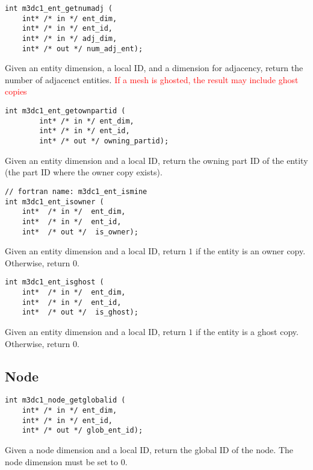 \begin{verbatim}
int m3dc1_ent_getnumadj (
    int* /* in */ ent_dim, 
    int* /* in */ ent_id, 
    int* /* in */ adj_dim,
    int* /* out */ num_adj_ent);
\end{verbatim}\vspace{-.5cm}\hspace{1cm}
Given an entity dimension, a local ID, and a dimension for adjacency, return the number of adjacenct entities. \textcolor{red}{If a mesh is ghosted, the result may include ghost copies}
	      
\begin{verbatim}
int m3dc1_ent_getownpartid (
        int* /* in */ ent_dim, 
        int* /* in */ ent_id, 
        int* /* out */ owning_partid); 
\end{verbatim}\vspace{-.5cm}\hspace{1cm}
Given an entity dimension and a local ID, return the owning part ID of the entity (the part ID where the owner copy exists). 

\begin{verbatim}
// fortran name: m3dc1_ent_ismine
int m3dc1_ent_isowner (
    int*  /* in */  ent_dim, 
    int*  /* in */  ent_id, 
    int*  /* out */  is_owner); 
\end{verbatim}\vspace{-.5cm}\hspace{1cm}
Given an entity dimension and a local ID, return $1$ if the entity is an owner copy. Otherwise, return $0$.

\begin{verbatim}
int m3dc1_ent_isghost (
    int*  /* in */  ent_dim, 
    int*  /* in */  ent_id, 
    int*  /* out */  is_ghost); 
\end{verbatim}\vspace{-.5cm}\hspace{1cm}
Given an entity dimension and a local ID, return $1$ if the entity is a ghost copy. Otherwise, return $0$.

\subsection{Node}
\begin{verbatim}
int m3dc1_node_getglobalid (
    int* /* in */ ent_dim, 
    int* /* in */ ent_id, 
    int* /* out */ glob_ent_id); 
\end{verbatim}\vspace{-.5cm}\hspace{1cm}
Given a node dimension and a local ID, return the global ID of the node. The node dimension must be set to 0.

